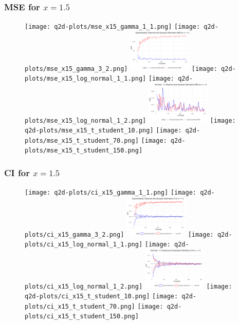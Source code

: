 \documentclass{article}
\begin{document}
{\subsubsection*{MSE for $x = 1.5$}

\begin{figure}[H]
  \centering
  \texttt{[image: q2d-plots/mse\_x15\_gamma\_1\_1.png]}
  \texttt{[image: q2d-plots/mse\_x15\_gamma\_3\_2.png]}
  \includegraphics[width=115px]{q2d-plots/mse_x15_exponential.png}
  \texttt{[image: q2d-plots/mse\_x15\_log\_normal\_1\_1.png]}
  \texttt{[image: q2d-plots/mse\_x15\_log\_normal\_1\_2.png]}
  \includegraphics[width=115px]{q2d-plots/mse_x15_normal.png}
  \texttt{[image: q2d-plots/mse\_x15\_t\_student\_10.png]}
  \texttt{[image: q2d-plots/mse\_x15\_t\_student\_70.png]}
  \texttt{[image: q2d-plots/mse\_x15\_t\_student\_150.png]}
  \label{fig:mse_x15}
\end{figure}

\subsubsection*{CI for $x = 1.5$}

\begin{figure}[H]
  \centering
  \texttt{[image: q2d-plots/ci\_x15\_gamma\_1\_1.png]}
  \texttt{[image: q2d-plots/ci\_x15\_gamma\_3\_2.png]}
  \includegraphics[width=115px]{q2d-plots/ci_x15_exponential.png}
  \texttt{[image: q2d-plots/ci\_x15\_log\_normal\_1\_1.png]}
  \texttt{[image: q2d-plots/ci\_x15\_log\_normal\_1\_2.png]}
  \includegraphics[width=115px]{q2d-plots/ci_x15_normal.png}
  \texttt{[image: q2d-plots/ci\_x15\_t\_student\_10.png]}
  \texttt{[image: q2d-plots/ci\_x15\_t\_student\_70.png]}
  \texttt{[image: q2d-plots/ci\_x15\_t\_student\_150.png]}
  \label{fig:ci_x15}
\end{figure}

}
\end{document}

